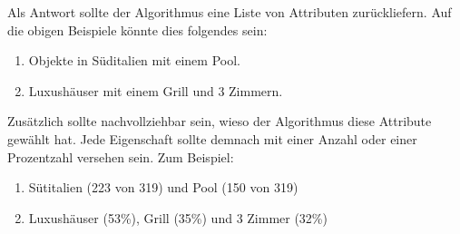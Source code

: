Als Antwort sollte der Algorithmus eine Liste von Attributen zurückliefern. Auf die obigen Beispiele könnte dies folgendes sein:
\begin{enumerate}
\item Objekte in Süditalien mit einem Pool.
\item Luxushäuser mit einem Grill und 3 Zimmern.
\end{enumerate}

Zusätzlich sollte nachvollziehbar sein, wieso der Algorithmus diese Attribute gewählt hat. Jede Eigenschaft sollte demnach mit einer Anzahl oder einer Prozentzahl versehen sein. Zum Beispiel:
\begin{enumerate}
\item Sütitalien (223 von 319) und Pool (150 von 319)
\item Luxushäuser (53\%), Grill (35\%) und 3 Zimmer (32\%)
\end{enumerate}